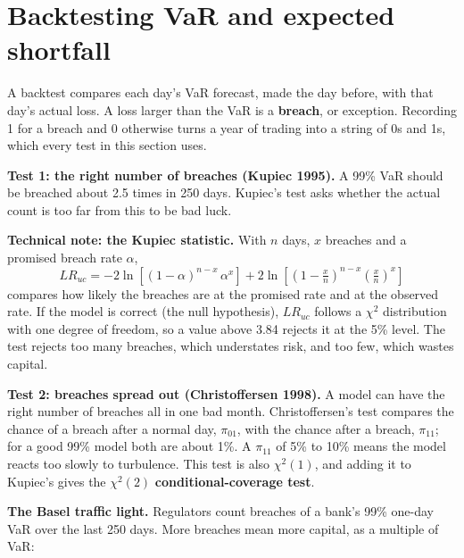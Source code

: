 \section{Backtesting VaR and expected shortfall}
\label{sec:11-backtest}

A backtest compares each day's VaR forecast, made the day before, with that day's actual loss. A loss larger than the VaR is a \textbf{breach}, or exception. Recording 1 for a breach and 0 otherwise turns a year of trading into a string of 0s and 1s, which every test in this section uses.

\textbf{Test 1: the right number of breaches (Kupiec 1995).} A 99\% VaR should be breached about 2.5 times in 250 days. Kupiec's test asks whether the actual count is too far from this to be bad luck.

\begin{technote}
\textbf{Technical note: the Kupiec statistic.} With $n$ days, $x$ breaches and a promised breach rate $\alpha$,
\begin{equation}
  LR_{uc} = -2\ln\!\left[(1 - \alpha)^{n-x}\,\alpha^{x}\right] + 2\ln\!\left[\left(1 - \tfrac{x}{n}\right)^{n-x}\left(\tfrac{x}{n}\right)^{x}\right]
  \label{eq:11-kupiec}
\end{equation}
compares how likely the breaches are at the promised rate and at the observed rate. If the model is correct (the null hypothesis), $LR_{uc}$ follows a $\chi^2$ distribution with one degree of freedom, so a value above 3.84 rejects it at the 5\% level. The test rejects too many breaches, which understates risk, and too few, which wastes capital.
\end{technote}

\textbf{Test 2: breaches spread out (Christoffersen 1998).} A model can have the right number of breaches all in one bad month. Christoffersen's test compares the chance of a breach after a normal day, $\pi_{01}$, with the chance after a breach, $\pi_{11}$; for a good 99\% model both are about 1\%. A $\pi_{11}$ of 5\% to 10\% means the model reacts too slowly to turbulence. This test is also $\chi^2(1)$, and adding it to Kupiec's gives the $\chi^2(2)$ \textbf{conditional-coverage test}.

\textbf{The Basel traffic light.} Regulators count breaches of a bank's 99\% one-day VaR over the last 250 days. More breaches mean more capital, as a multiple of VaR:

